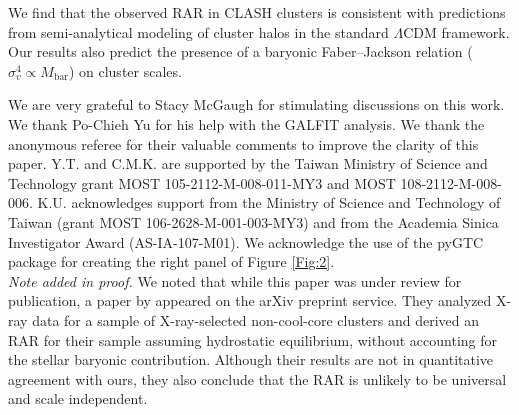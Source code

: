 \documentclass[a4paper,iop,twocolumn,twocolappendix,numberedappendix,appendixfloats]{emulateapj}
\begin{document}
We find that the observed RAR in CLASH clusters is consistent with
predictions from semi-analytical modeling of cluster halos in the
standard $\Lambda$CDM framework.
Our results also predict the presence of a baryonic Faber--Jackson
relation ($\sigma_v^4\propto M_\mathrm{bar}$) on cluster scales.


\acknowledgments

We are very grateful to Stacy McGaugh for stimulating discussions on this work.
We thank Po-Chieh Yu for his help with the GALFIT analysis.
We thank the anonymous referee for their valuable comments to improve
the clarity of this paper.
Y.T. and C.M.K. are supported by the Taiwan Ministry of Science and
Technology grant MOST 105-2112-M-008-011-MY3 and MOST 108-2112-M-008-006.
K.U. acknowledges support from the Ministry of Science and Technology of
Taiwan (grant MOST 106-2628-M-001-003-MY3) and from
the Academia Sinica Investigator Award (AS-IA-107-M01).
We acknowledge the use of the pyGTC package \citep{Bocquet16} for
creating the right panel of Figure \ref{Fig:2}.\\


\noindent
\textit{Note added in proof.}
We noted that while this paper was under review for publication, a paper
 by \cite{CD16} appeared on the arXiv preprint service.
They analyzed X-ray data for a sample of X-ray-selected non-cool-core
 clusters and derived an RAR for their sample assuming hydrostatic
 equilibrium, without accounting for the stellar baryonic contribution.
Although their results are not in quantitative agreement with ours, they
 also conclude that the RAR is unlikely to be universal and scale
 independent.



\end{document}
